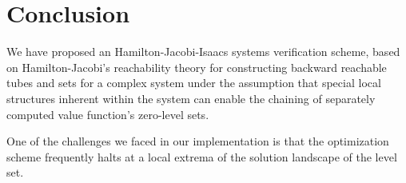 \section{Conclusion}
\label{sec:conclude}
%
We have proposed an Hamilton-Jacobi-Isaacs systems verification scheme, based on Hamilton-Jacobi's reachability theory for constructing backward reachable tubes and sets for a complex system under the assumption that special local structures inherent within the system can enable the chaining of separately computed value function's zero-level sets. 

One of the challenges we faced in our implementation is that the optimization scheme frequently halts at a local extrema of the solution landscape of the level set. 